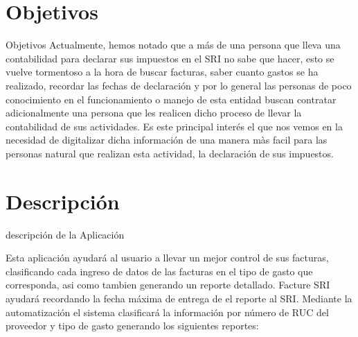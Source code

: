 \documentclass[utf8]{beamer}
\begin{document}
\section{Objetivos}
\begin{frame}[allowframebreaks]

\begin{block}{Objetivos}
Actualmente,  hemos notado que a más de una persona que lleva una contabilidad para declarar sus impuestos en el SRI no sabe que hacer, esto se vuelve tormentoso a la hora de buscar facturas, saber cuanto gastos se ha realizado, recordar las fechas de declaración y por lo general las personas de poco conocimiento en el funcionamiento o manejo de esta entidad buscan contratar adicionalmente una persona que les realicen dicho proceso de llevar la contabilidad de sus actividades. Es este principal interés el que nos vemos en la necesidad de digitalizar dicha información de una manera màs facil para las personas natural que realizan esta actividad, la declaración de sus impuestos.
\end {block}
\end{frame}



\section{Descripción}

\begin{frame}[allowframebreaks]


\begin{block}{descripción de la Aplicación}

Esta aplicación ayudará al usuario a llevar un mejor control de sus facturas, clasificando cada ingreso de datos de las facturas en el tipo de gasto que corresponda, asi como tambien generando un reporte detallado. 
Facture SRI  ayudará  recordando la fecha máxima de entrega de el reporte al SRI. 
Mediante la automatización el sistema clasificará la información por número de RUC del proveedor y tipo de gasto generando los siguientes reportes: 
\end {block}

\end{frame}
\end{document}
